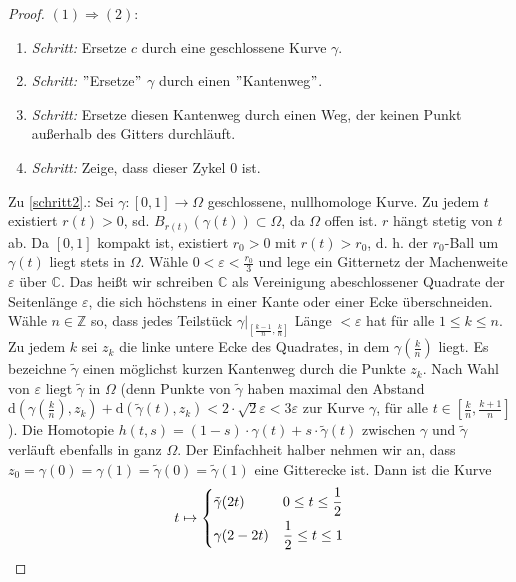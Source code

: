 \documentclass[11pt,titlepage]{article}
\theoremstyle{definition}
\theoremstyle{remark}
\begin{document}
	\begin{proof}
		$(1)\Rightarrow (2)$:
		\begin{enumerate}
			\item \textsl{Schritt:} Ersetze $c$ durch eine geschlossene Kurve $\gamma$. \label{schritt1}
			\item \textsl{Schritt:} $"$Ersetze$"$ $\gamma$ durch einen $"$Kantenweg$"$. \label{schritt2}
			\item \textsl{Schritt:} Ersetze diesen Kantenweg durch einen Weg, der keinen Punkt außerhalb 
			des Gitters durchläuft. \label{schritt3}
			\item \textsl{Schritt:} Zeige, dass dieser Zykel $0$ ist. \label{schritt4}
		\end{enumerate}
		Zu \ref{schritt2}.: Sei $\gamma:[0,1]\to\Omega$ geschlossene, nullhomologe Kurve. Zu jedem $t$ 
		existiert 
		$r(t)>0$, sd. $B_{r(t)}(\gamma(t))\subset\Omega$, da $\Omega$ offen ist. $r$ hängt stetig von $t$ ab. 
		Da $[0,1]$ kompakt ist, existiert $r_0 >0$ mit $r(t)>r_0$, d. h. der $r_0$-Ball um $\gamma(t)$ liegt 
		stets in $\Omega$. Wähle $0<\varepsilon <\frac{r_0}{3}$ und lege ein Gitternetz der 
		Machenweite $\varepsilon$ über $\mathbb{C}$. Das heißt wir schreiben $\mathbb{C}$ als 
		Vereinigung abeschlossener Quadrate der Seitenlänge $\varepsilon$, die sich höchstens in 
		einer Kante oder einer Ecke überschneiden. Wähle $n\in\mathbb{Z}$ so, dass jedes Teilstück 
		$\gamma |_{[\frac{k-1}{n},\frac{k}{n}]}$ Länge $<\varepsilon$ hat für alle $1\leq k\leq n$. 
		Zu jedem $k$ sei $z_k$ die linke untere Ecke des Quadrates, in dem $\gamma(\frac{k}{n})$ liegt. 
		Es bezeichne $\tilde{\gamma}$ einen möglichst kurzen Kantenweg durch die Punkte $z_k$. 
		Nach Wahl von $\varepsilon$ liegt $\tilde{\gamma}$ in $\Omega$ (denn Punkte von $\tilde{\gamma}$ 
		haben maximal den Abstand $\mathrm{d}(\gamma(\frac{k}{n}),z_k)+\mathrm{d}(\tilde{\gamma}(t),z_k)
		<2\cdot \sqrt{2}\varepsilon <3\varepsilon$ zur Kurve $\gamma$, für alle $t\in [\frac{k}{n},\frac{k+1}{n}]$). 
		Die Homotopie $h(t,s)=(1-s)\cdot \gamma(t) +s\cdot \tilde{\gamma}(t)$ zwischen $\gamma$ und 
		$\tilde{\gamma}$ verläuft ebenfalls in ganz $\Omega$. Der Einfachheit halber nehmen wir an, dass 
		$z_0 =\gamma(0) =\gamma(1) =\tilde{\gamma}(0) =\tilde{\gamma}(1)$ eine Gitterecke ist. Dann ist 
		die Kurve 
		\[ t\mapsto \begin{dcases} \tilde{\gamma}(2t) & 0\leq t\leq \frac{1}{2} \\
		\gamma(2-2t) & \frac{1}{2} \leq t\leq 1 \end{dcases} \] 

\end{proof}
\end{document}
